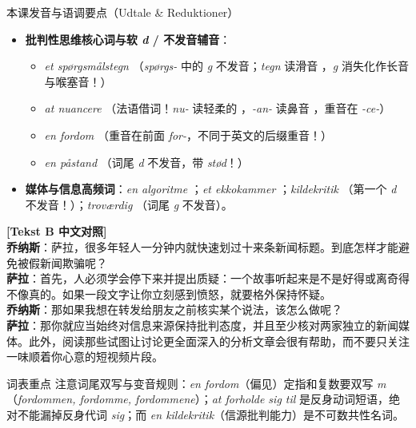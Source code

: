 \begin{tipbox}{本课发音与语调要点（Udtale \& Reduktioner）}
\begin{itemize}
  \item \textbf{批判性思维核心词与软 \textit{d} / 不发音辅音}：
    \begin{itemize}
      \item \textit{et spørgsmålstegn} （\textit{spørgs-} 中的 \textit{g} 不发音；\textit{tegn} 读滑音 ，\textit{g} 消失化作长音与喉塞音！）
      \item \textit{at nuancere} （法语借词！\textit{nu-} 读轻柔的 ，\textit{-an-} 读鼻音 ，重音在 \textit{-ce-}）
      \item \textit{en fordom} （重音在前面 \textit{for-}，不同于英文的后缀重音！）
      \item \textit{en påstand} （词尾 \textit{d} 不发音，带 \textit{stød}！）
    \end{itemize}
  \item \textbf{媒体与信息高频词}：\textit{en algoritme} ；\textit{et ekkokammer} ；\textit{kildekritik} （第一个 \textit{d} 不发音！）；\textit{troværdig} （词尾 \textit{g} 不发音）。
\end{itemize}
\end{tipbox}

\begin{transbox}
\small
\textbf{\color{NCDTeal}[Tekst B 中文对照]}\\
\textbf{乔纳斯}：萨拉，很多年轻人一分钟内就快速划过十来条新闻标题。到底怎样才能避免被假新闻欺骗呢？\\
\textbf{萨拉}：首先，人必须学会停下来并提出质疑：一个故事听起来是不是好得或离奇得不像真的。如果一段文字让你立刻感到愤怒，就要格外保持怀疑。\\
\textbf{乔纳斯}：那如果我想在转发给朋友之前核实某个说法，该怎么做呢？\\
\textbf{萨拉}：那你就应当始终对信息来源保持批判态度，并且至少核对两家独立的新闻媒体。此外，阅读那些试图让讨论更全面深入的分析文章会很有帮助，而不要只关注一味顺着你心意的短视频片段。
\end{transbox}


\begin{tipbox}{词表重点}
注意词尾双写与变音规则：\textit{en fordom}（偏见）定指和复数要双写 \textit{m}（\textit{fordommen, fordomme, fordommene}）；\textit{at forholde sig til} 是反身动词短语，绝对不能漏掉反身代词 \textit{sig}；而 \textit{en kildekritik}（信源批判能力）是不可数共性名词。
\end{tipbox}

